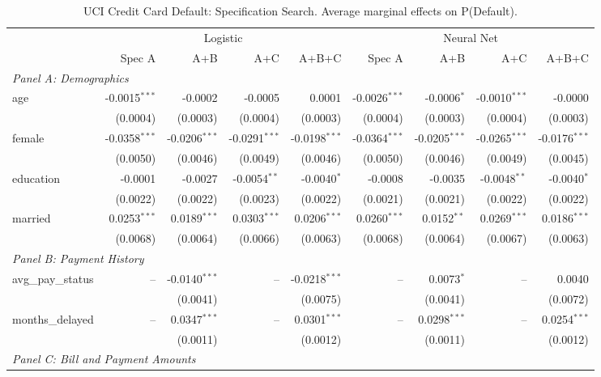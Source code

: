 \begin{table}[htbp]
\centering
\small
\begin{threeparttable}
\caption{UCI Credit Card Default: Specification Search. Average marginal effects on P(Default).}
\label{tab:credit_default_spec_search}
\begin{tabular}{lrrrrrrrr}
\toprule
 & \multicolumn{4}{c}{Logistic} & \multicolumn{4}{c}{Neural Net} \\
\cmidrule(lr){2-5} \cmidrule(lr){6-9} 
 & Spec A & A+B & A+C & A+B+C & Spec A & A+B & A+C & A+B+C \\
\midrule
\multicolumn{9}{l}{\textit{Panel A: Demographics}} \\
\quad age & -0.0015$^{***}$ & -0.0002 & -0.0005 & 0.0001 & -0.0026$^{***}$ & -0.0006$^{*}$ & -0.0010$^{***}$ & -0.0000 \\
 & (0.0004) & (0.0003) & (0.0004) & (0.0003) & (0.0004) & (0.0003) & (0.0004) & (0.0003) \\
\quad female & -0.0358$^{***}$ & -0.0206$^{***}$ & -0.0291$^{***}$ & -0.0198$^{***}$ & -0.0364$^{***}$ & -0.0205$^{***}$ & -0.0265$^{***}$ & -0.0176$^{***}$ \\
 & (0.0050) & (0.0046) & (0.0049) & (0.0046) & (0.0050) & (0.0046) & (0.0049) & (0.0045) \\
\quad education & -0.0001 & -0.0027 & -0.0054$^{**}$ & -0.0040$^{*}$ & -0.0008 & -0.0035 & -0.0048$^{**}$ & -0.0040$^{*}$ \\
 & (0.0022) & (0.0022) & (0.0023) & (0.0022) & (0.0021) & (0.0021) & (0.0022) & (0.0022) \\
\quad married & 0.0253$^{***}$ & 0.0189$^{***}$ & 0.0303$^{***}$ & 0.0206$^{***}$ & 0.0260$^{***}$ & 0.0152$^{**}$ & 0.0269$^{***}$ & 0.0186$^{***}$ \\
 & (0.0068) & (0.0064) & (0.0066) & (0.0063) & (0.0068) & (0.0064) & (0.0067) & (0.0063) \\
\midrule
\multicolumn{9}{l}{\textit{Panel B: Payment History}} \\
\quad avg\_pay\_status & -- & -0.0140$^{***}$ & -- & -0.0218$^{***}$ & -- & 0.0073$^{*}$ & -- & 0.0040 \\
 &  & (0.0041) &  & (0.0075) &  & (0.0041) &  & (0.0072) \\
\quad months\_delayed & -- & 0.0347$^{***}$ & -- & 0.0301$^{***}$ & -- & 0.0298$^{***}$ & -- & 0.0254$^{***}$ \\
 &  & (0.0011) &  & (0.0012) &  & (0.0011) &  & (0.0012) \\
\midrule
\multicolumn{9}{l}{\textit{Panel C: Bill and Payment Amounts}} \\

\end{tabular}
\end{threeparttable}
\end{table}

